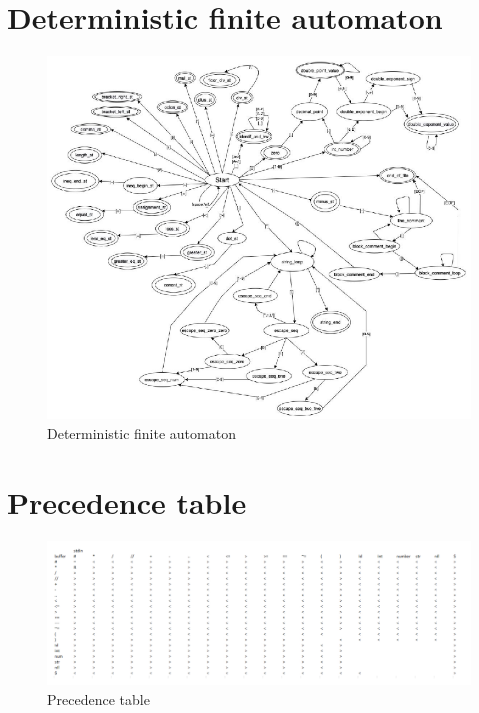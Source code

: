 \documentclass[11pt]{article}
\begin{document}
\section{Deterministic finite automaton}
\begin{figure}[ht]
    \centering
    \includegraphics[width=0.95\linewidth]{finite_lexical_automat.eps}
    \caption{Deterministic finite automaton}
    \label{lexical_automat}
\end{figure}

\newpage

\newpage
\section{Precedence table}
\begin{figure}[ht]
    \centering
    \includegraphics[width=0.95\linewidth]{Precedence_table.pdf}
    \caption{Precedence table}
    \label{Precedence_table}
\end{figure}
\end{document}
